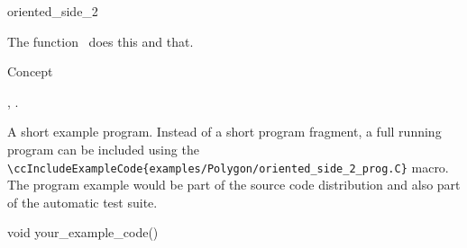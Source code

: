 

\begin{ccRefFunction}{oriented_side_2}  %


\ccDefinition
  
The function \ccRefName\ does this and that.



\ccIsModel

Concept

\ccSeeAlso

,
.

\ccExample

A short example program.
Instead of a short program fragment, a full running program can be
included using the 
\verb|\ccIncludeExampleCode{examples/Polygon/oriented_side_2_prog.C}| 
macro. The program example would be part of the source code distribution and
also part of the automatic test suite.

\begin{ccExampleCode}
void your_example_code() {
}
\end{ccExampleCode}


\end{ccRefFunction}


